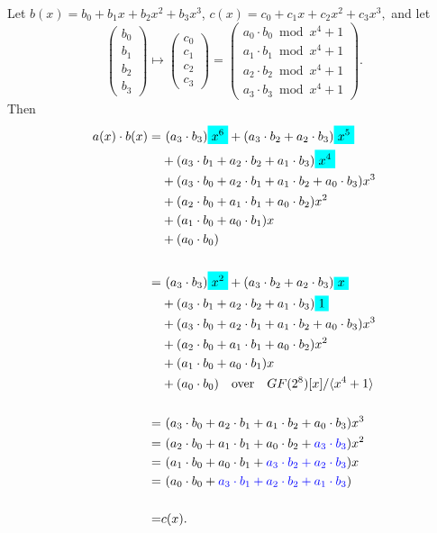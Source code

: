 Let $b(x) = b_0 + b_1x + b_2x^2 + b_3x^3$, $c(x) = c_0 + c_1x + c_2x^2 + c_3x^3,$ and let
\[
\begin{pmatrix}
	b_0 \\ b_1 \\ b_2 \\ b_3
\end{pmatrix}{\mapsto}
\begin{pmatrix}
	c_0 \\ c_1 \\ c_2 \\ c_3
\end{pmatrix}=
\begin{pmatrix}
	a_0\cdot b_0\bmod x^4+1 \\
	a_1\cdot b_1\bmod x^4+1 \\
	a_2\cdot b_2\bmod x^4+1 \\
	a_3\cdot b_3\bmod x^4+1
\end{pmatrix}.
\]
Then \begin{align*}
	a(x)\cdot b(x) =&\ (a_3\cdot b_3)\mathcolorbox{-red}{x^6} + (a_3\cdot b_2+a_2\cdot b_3)\mathcolorbox{-red}{x^5} \\
	& +(a_3\cdot b_1 + a_2\cdot b_2 + a_1\cdot b_3)\mathcolorbox{-red}{x^4} \\
	& +(a_3\cdot b_0 + a_2\cdot b_1 + a_1\cdot b_2 + a_0\cdot b_3)x^3 \\
	& +(a_2\cdot b_0 + a_1\cdot b_1 + a_0\cdot b_2)x^2 \\
	& +(a_1\cdot b_0 + a_0\cdot b_1)x \\
	& +(a_0\cdot b_0) \\
	\\
	=&\ (a_3\cdot b_3)\mathcolorbox{-red}{x^2} + (a_3\cdot b_2+a_2\cdot b_3)\mathcolorbox{-red}{x} \\
	& +(a_3\cdot b_1 + a_2\cdot b_2 + a_1\cdot b_3)\mathcolorbox{-red}{1} \\
	& +(a_3\cdot b_0 + a_2\cdot b_1 + a_1\cdot b_2 + a_0\cdot b_3)x^3 \\
	& +(a_2\cdot b_0 + a_1\cdot b_1 + a_0\cdot b_2)x^2 \\
	& +(a_1\cdot b_0 + a_0\cdot b_1)x \\
	& +(a_0\cdot b_0)\quad\text{over}\quad GF(2^8)[x]/\gen{x^4+1} \\
	\\
	=&\ (a_3\cdot b_0 + a_2\cdot b_1 + a_1\cdot b_2 + a_0\cdot b_3)x^3 \\
	=&\ (a_2\cdot b_0 + a_1\cdot b_1 + a_0\cdot b_2 + \textcolor{blue}{a_3\cdot b_3})x^2 \\
	=&\ (a_1\cdot b_0 + a_0\cdot b_1 + \textcolor{blue}{a_3\cdot b_2 + a_2\cdot b_3})x \\
	=&\ (a_0\cdot b_0 + \textcolor{blue}{a_3\cdot b_1 + a_2\cdot b_2 + a_1\cdot b_3}) \\
	\\
	=& c(x).
\end{align*}

